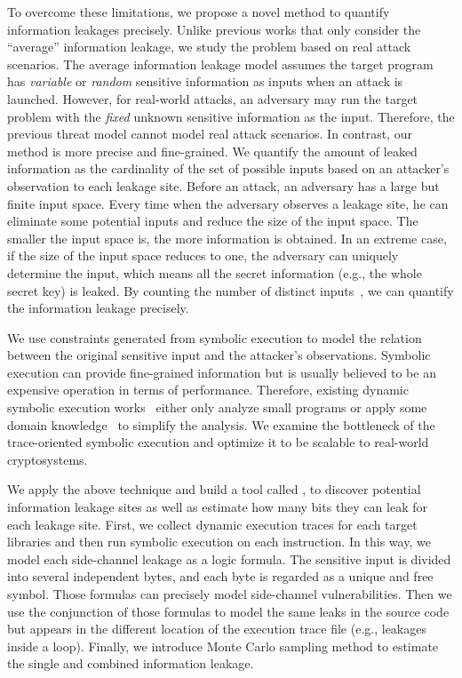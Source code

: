 To overcome these limitations, we propose a novel method to quantify information
leakages precisely. Unlike previous works that only consider the
``average'' information leakage, we study the problem based on real attack
scenarios. The average information leakage model assumes the target program has
\emph{variable} or \emph{random} sensitive information as inputs when an attack is
launched. However, for real-world attacks, an adversary may run the target
problem with the \emph{fixed} unknown sensitive information
as the input. Therefore, the previous threat model cannot model real attack
scenarios. In contrast, our method is more precise and fine-grained. 
We quantify
the amount of leaked information as the cardinality of the set of possible
inputs based on an attacker's observation to each leakage site.
Before an attack, an adversary has a large but finite input space. Every time
when the adversary observes a leakage site, he can eliminate some potential
inputs and reduce the size of the input space. The smaller the input space is,
the more information is obtained. In an extreme case, if the size of the
input space reduces to one, the adversary can uniquely determine the input, 
which means all the secret information (e.g., the whole secret key) is
leaked. By counting the number of distinct inputs~\cite{10.1007/11499107_24}, we can quantify the
information leakage precisely.

We use constraints generated from symbolic execution to model the relation 
between the original sensitive input
and the attacker's observations. Symbolic execution can
provide fine-grained information but is usually believed to be an expensive
operation in terms of performance. Therefore, existing dynamic symbolic
execution works~\cite{203878,236338,Brotzman19Casym} either only analyze
small programs or apply some domain knowledge~\cite{203878} to simplify the analysis. We
examine the bottleneck of the trace-oriented symbolic execution and optimize it
to be scalable to real-world cryptosystems.

We apply the above technique and build a tool called \tool{}, 
to discover potential information leakage sites as well as estimate how
many bits they can leak for each leakage site. 
First, we collect dynamic execution traces for each target
libraries and then run symbolic execution on each instruction. In this way, we model
each side-channel leakage as a logic formula. The sensitive input is divided into
several independent bytes, and each byte is regarded as a unique and free symbol. Those
formulas can precisely model side-channel vulnerabilities. Then we use the conjunction
of those formulas to model the same leaks in the source code but appears in the different location of
the execution trace file (e.g., leakages inside a loop).
Finally, we introduce Monte Carlo
sampling method to estimate the single and combined information leakage. 


